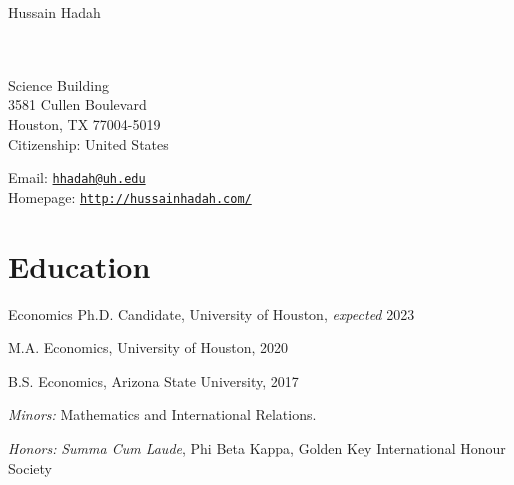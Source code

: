 \documentclass[10pt,letterpaper]{article}
\newcommand{\MYhref}[3][black]{\href{#2}{\color{#1}{#3}}}%
\def\name{Hussain Hadah}
\renewenvironment{itemize}{
  \begin{list}{}{
    \setlength{\leftmargin}{1.5em}
  }
}{
  \end{list}
}
\begin{document}
{\Huge \name}


\vspace{0.25in}

\begin{minipage}[t]{0.5\textwidth}
  \MYhref{https://www.uh.edu/}{University of Houston} \\
  \MYhref{https://www.uh.edu/class/economics/}{Department of Economics} \\
  Science Building \\
  3581 Cullen Boulevard \\
  Houston, TX 77004-5019 \\
  Citizenship: United States
\end{minipage}
\begin{minipage}[t]{0.5\textwidth}
  Email: \href{mailto:hhadah@uh.edu}{\tt hhadah@uh.edu} \\
  Homepage: \href{http://hussainhadah.com/}{\tt http://hussainhadah.com/} \\
\end{minipage}

\section*{Education}

\begin{itemize}
  \item Economics Ph.D. Candidate, University of Houston, \textit{expected} 2023

  \item M.A. Economics, University of Houston, 2020

  \item B.S. Economics, Arizona State University, 2017
    \begin{itemize}
    \item \textit{Minors:} Mathematics and International Relations.
    \item \textit{Honors:} \textit{Summa Cum Laude}, Phi Beta Kappa, Golden 
    Key International Honour Society
    \end{itemize}

\end{itemize}
\end{document}
